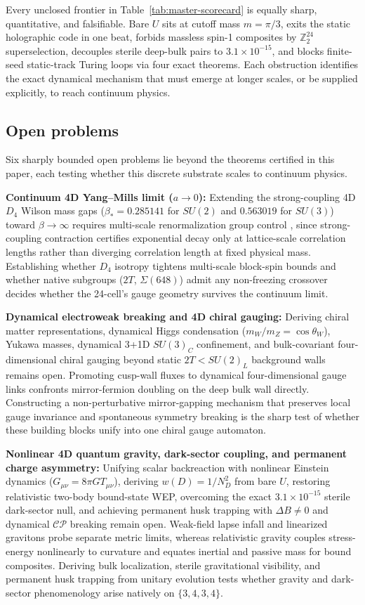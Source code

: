 Every unclosed frontier in Table~\ref{tab:master-scorecard} is equally sharp, quantitative, and falsifiable. Bare $U$
sits at cutoff mass $m = \pi/3$, exits the static holographic code in one beat, forbids massless spin-1 composites by
$\mathbb{Z}_2^{24}$ superselection, decouples sterile deep-bulk pairs to $3.1 \times 10^{-15}$, and blocks finite-seed
static-track Turing loops via four exact theorems. Each obstruction identifies the exact dynamical mechanism that must
emerge at longer scales, or be supplied explicitly, to reach continuum physics.

\subsection{Open problems}

Six sharply bounded open problems lie beyond the theorems certified in this paper, each testing whether this discrete
substrate scales to continuum physics.

\textbf{Continuum 4D Yang--Mills limit ($a \to 0$):} Extending the strong-coupling 4D $D_4$ Wilson mass gaps
($\beta_* = 0.285141$ for $SU(2)$ and $0.563019$ for $SU(3)$) toward $\beta \to \infty$ requires multi-scale
renormalization group control \cite{balaban1989}, since strong-coupling contraction certifies exponential decay only at
lattice-scale correlation lengths rather than diverging correlation length at fixed physical mass. Establishing whether
$D_4$ isotropy tightens multi-scale block-spin bounds and whether native subgroups ($2T$, $\Sigma(648)$) admit any
non-freezing crossover decides whether the 24-cell's gauge geometry survives the continuum limit.

\textbf{Dynamical electroweak breaking and 4D chiral gauging:} Deriving chiral matter representations, dynamical Higgs
condensation ($m_W / m_Z = \cos\theta_W$), Yukawa masses, dynamical 3+1D $SU(3)_C$ confinement, and bulk-covariant
four-dimensional chiral gauging beyond static $2T < SU(2)_L$ background walls remains open. Promoting cusp-wall fluxes
to dynamical four-dimensional gauge links confronts mirror-fermion doubling on the deep bulk wall directly. Constructing
a non-perturbative mirror-gapping mechanism that preserves local gauge invariance and spontaneous symmetry breaking is
the sharp test of whether these building blocks unify into one chiral gauge automaton.

\textbf{Nonlinear 4D quantum gravity, dark-sector coupling, and permanent charge asymmetry:} Unifying scalar
backreaction with nonlinear Einstein dynamics ($G_{\mu\nu} = 8\pi G T_{\mu\nu}$), deriving $w(D) = 1/N_D^2$ from bare
$U$, restoring relativistic two-body bound-state WEP, overcoming the exact $3.1 \times 10^{-15}$ sterile dark-sector
null, and achieving permanent husk trapping with $\Delta B \neq 0$ and dynamical $\mathcal{CP}$ breaking remain open.
Weak-field lapse infall and linearized gravitons probe separate metric limits, whereas relativistic gravity couples
stress-energy nonlinearly to curvature and equates inertial and passive mass for bound composites. Deriving bulk
localization, sterile gravitational visibility, and permanent husk trapping from unitary evolution tests whether gravity
and dark-sector phenomenology arise natively on $\{3,4,3,4\}$.

